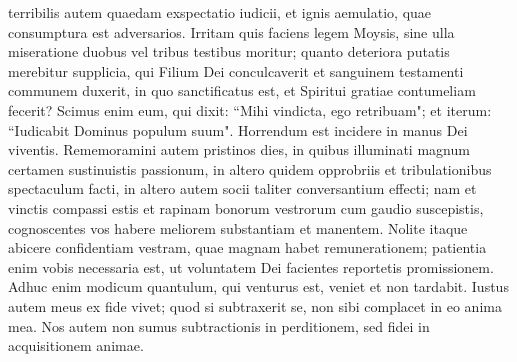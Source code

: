 \begin{biblechapter}
\verse terribilis autem quaedam exspectatio iudicii, et ignis aemulatio, quae consumptura est adversarios.  
\verse Irritam quis faciens legem Moysis, sine ulla miseratione duobus vel tribus testibus moritur; 
\verse quanto deteriora putatis merebitur supplicia, qui Filium Dei conculcaverit et sanguinem testamenti communem duxerit, in quo sanctificatus est, et Spiritui gratiae contumeliam fecerit?  
\verse Scimus enim eum, qui dixit: “Mihi vindicta, ego retribuam"; et iterum: “Iudicabit Dominus populum suum". 
\verse Horrendum est incidere in manus Dei viventis. 
\verse Rememoramini autem pristinos dies, in quibus illuminati magnum certamen sustinuistis passionum, 
\verse in altero quidem opprobriis et tribulationibus spectaculum facti, in altero autem socii taliter conversantium effecti; 
\verse nam et vinctis compassi estis et rapinam bonorum vestrorum cum gaudio suscepistis, cognoscentes vos habere meliorem substantiam et manentem. 
\verse Nolite itaque abicere confidentiam vestram, quae magnam habet remunerationem; 
\verse patientia enim vobis necessaria est, ut voluntatem Dei facientes reportetis promissionem. 
\verse Adhuc enim modicum quantulum, qui venturus est, veniet et non tardabit. 
\verse Iustus autem meus ex fide vivet; quod si subtraxerit se, non sibi complacet in eo anima mea. 
\verse Nos autem non sumus subtractionis in perditionem, sed fidei in acquisitionem animae. 
\end{biblechapter}

